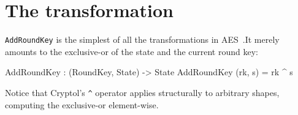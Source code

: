 
\section{The {} transformation}
\label{sec:ttfam-addr-transf}

{\tt AddRoundKey} is the simplest of all the transformations in
AES~\cite[section 5.1.4]{aes}.\indAES It merely amounts to the
exclusive-or of the state and the current round key:\indXOr
\begin{code}
  AddRoundKey : (RoundKey, State) -> State
  AddRoundKey (rk, s) = rk ^ s
\end{code}
Notice that Cryptol's {\tt \Verb|^|} operator applies structurally to
arbitrary shapes, computing the exclusive-or element-wise.

